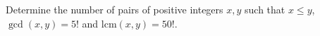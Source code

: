 Determine the number of pairs of positive integers $x,y$ such that $x\le y$,  $\gcd (x,y)=5!$ and $\text{lcm}(x,y)=50!$.
